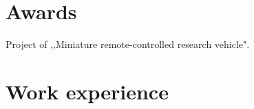 \documentclass[letterpaper]{template/twentysecondcv_en} %
\begin{document}




\vspace{-0.25cm}
\section{Awards}

\begin{twentyshort} %
	 {Project of ,,Miniature remote-controlled research vehicle".}
\end{twentyshort}

\vspace{-0.25cm}
\section{Work experience}
\end{document}
